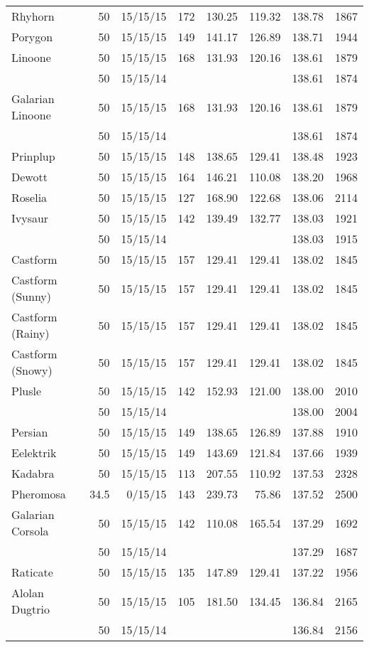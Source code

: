 \begin{longtable}{lrrrrrrr}
Rhyhorn & 50 & 15/15/15 & 172 & 130.25 & 119.32 & 138.78 & 1867\\
Porygon & 50 & 15/15/15 & 149 & 141.17 & 126.89 & 138.71 & 1944\\
Linoone & 50 & 15/15/15 & 168 & 131.93 & 120.16 & 138.61 & 1879\\
 & 50 & 15/15/14 & & & & 138.61 & 1874\\
Galarian Linoone & 50 & 15/15/15 & 168 & 131.93 & 120.16 & 138.61 & 1879\\
 & 50 & 15/15/14 & & & & 138.61 & 1874\\
Prinplup & 50 & 15/15/15 & 148 & 138.65 & 129.41 & 138.48 & 1923\\
Dewott & 50 & 15/15/15 & 164 & 146.21 & 110.08 & 138.20 & 1968\\
Roselia & 50 & 15/15/15 & 127 & 168.90 & 122.68 & 138.06 & 2114\\
Ivysaur & 50 & 15/15/15 & 142 & 139.49 & 132.77 & 138.03 & 1921\\
 & 50 & 15/15/14 & & & & 138.03 & 1915\\
Castform & 50 & 15/15/15 & 157 & 129.41 & 129.41 & 138.02 & 1845\\
Castform (Sunny) & 50 & 15/15/15 & 157 & 129.41 & 129.41 & 138.02 & 1845\\
Castform (Rainy) & 50 & 15/15/15 & 157 & 129.41 & 129.41 & 138.02 & 1845\\
Castform (Snowy) & 50 & 15/15/15 & 157 & 129.41 & 129.41 & 138.02 & 1845\\
Plusle & 50 & 15/15/15 & 142 & 152.93 & 121.00 & 138.00 & 2010\\
 & 50 & 15/15/14 & & & & 138.00 & 2004\\
Persian & 50 & 15/15/15 & 149 & 138.65 & 126.89 & 137.88 & 1910\\
Eelektrik & 50 & 15/15/15 & 149 & 143.69 & 121.84 & 137.66 & 1939\\
Kadabra & 50 & 15/15/15 & 113 & 207.55 & 110.92 & 137.53 & 2328\\
Pheromosa & 34.5 & 0/15/15 & 143 & 239.73 & 75.86 & 137.52 & 2500\\
Galarian Corsola & 50 & 15/15/15 & 142 & 110.08 & 165.54 & 137.29 & 1692\\
 & 50 & 15/15/14 & & & & 137.29 & 1687\\
Raticate & 50 & 15/15/15 & 135 & 147.89 & 129.41 & 137.22 & 1956\\
Alolan Dugtrio & 50 & 15/15/15 & 105 & 181.50 & 134.45 & 136.84 & 2165\\
 & 50 & 15/15/14 & & & & 136.84 & 2156\\

\end{longtable}
